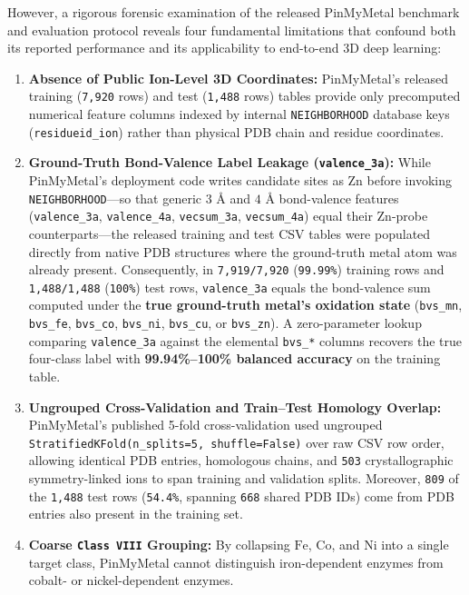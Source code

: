 \documentclass[10pt,a4paper,twocolumn]{article}
\begin{document}
However, a rigorous forensic examination of the released PinMyMetal benchmark and evaluation protocol reveals four fundamental limitations that confound both its reported performance and its applicability to end-to-end 3D deep learning:
\begin{enumerate}
  \item \textbf{Absence of Public Ion-Level 3D Coordinates:} PinMyMetal's released training (\texttt{7,920} rows) and test (\texttt{1,488} rows) tables provide only precomputed numerical feature columns indexed by internal \texttt{NEIGHBORHOOD} database keys (\texttt{residueid\_ion}) rather than physical PDB chain and residue coordinates.
  \item \textbf{Ground-Truth Bond-Valence Label Leakage (\texttt{valence\_3a}):} While PinMyMetal's deployment code writes candidate sites as $\text{Zn}$ before invoking \texttt{NEIGHBORHOOD}---so that generic $3\text{ \AA}$ and $4\text{ \AA}$ bond-valence features (\texttt{valence\_3a}, \texttt{valence\_4a}, \texttt{vecsum\_3a}, \texttt{vecsum\_4a}) equal their $\text{Zn}$-probe counterparts---the released training and test CSV tables were populated directly from native PDB structures where the ground-truth metal atom was already present. Consequently, in \texttt{7,919/7,920} (\texttt{99.99\%}) training rows and \texttt{1,488/1,488} (\texttt{100\%}) test rows, \texttt{valence\_3a} equals the bond-valence sum computed under the \textbf{true ground-truth metal's oxidation state} (\texttt{bvs\_mn}, \texttt{bvs\_fe}, \texttt{bvs\_co}, \texttt{bvs\_ni}, \texttt{bvs\_cu}, or \texttt{bvs\_zn}). A zero-parameter lookup comparing \texttt{valence\_3a} against the elemental \texttt{bvs\_*} columns recovers the true four-class label with \textbf{99.94\%--100\% balanced accuracy} on the training table.
  \item \textbf{Ungrouped Cross-Validation and Train--Test Homology Overlap:} PinMyMetal's published 5-fold cross-validation used ungrouped \texttt{StratifiedKFold(n\_splits=5, shuffle=False)} over raw CSV row order, allowing identical PDB entries, homologous chains, and \texttt{503} crystallographic symmetry-linked ions to span training and validation splits. Moreover, \texttt{809} of the \texttt{1,488} test rows (\texttt{54.4\%}, spanning \texttt{668} shared PDB IDs) come from PDB entries also present in the training set.
  \item \textbf{Coarse \texttt{Class VIII} Grouping:} By collapsing $\text{Fe}$, $\text{Co}$, and $\text{Ni}$ into a single target class, PinMyMetal cannot distinguish iron-dependent enzymes from cobalt- or nickel-dependent enzymes.
\end{enumerate}
\end{document}
